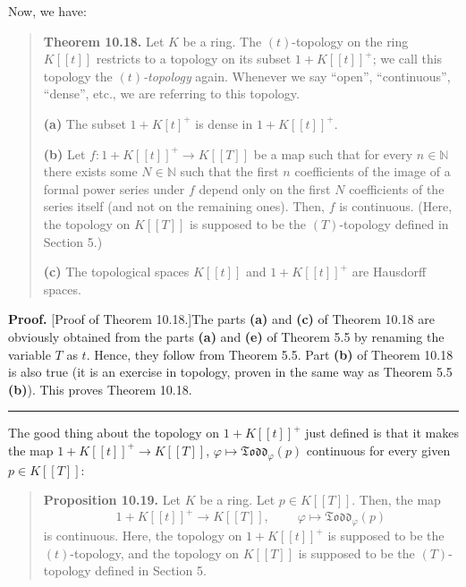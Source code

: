 \documentclass[numbers=enddot,12pt,final,onecolumn,notitlepage]{scrartcl}%
\newenvironment{proof}[1][Proof]{\noindent\textbf{#1.} }{\ \rule{0.5em}{0.5em}}
\begin{document}
Now, we have:

\begin{quote}
\textbf{Theorem 10.18.} Let $K$ be a ring. The $\left(  t\right)  $-topology
on the ring $K\left[  \left[  t\right]  \right]  $ restricts to a topology on
its subset $1+K\left[  \left[  t\right]  \right]  ^{+}$; we call this topology
the $\left(  t\right)  $\textit{-topology} again. Whenever we say ``open'',
``continuous'', ``dense'', etc., we are referring to this topology.

\textbf{(a)} The subset $1+K\left[  t\right]  ^{+}$ is dense in $1+K\left[
\left[  t\right]  \right]  ^{+}$.

\textbf{(b)} Let $f:1+K\left[  \left[  t\right]  \right]  ^{+}\rightarrow
K\left[  \left[  T\right]  \right]  $ be a map such that for every
$n\in\mathbb{N}$ there exists some $N\in\mathbb{N}$ such that the first $n$
coefficients of the image of a formal power series under $f$ depend only on
the first $N$ coefficients of the series itself (and not on the remaining
ones). Then, $f$ is continuous. (Here, the topology on $K\left[  \left[
T\right]  \right]  $ is supposed to be the $\left(  T\right)  $-topology
defined in Section 5.)

\textbf{(c)} The topological spaces $K\left[  \left[  t\right]  \right]  $ and
$1+K\left[  \left[  t\right]  \right]  ^{+}$ are Hausdorff spaces.
\end{quote}

\begin{proof}
[Proof of Theorem 10.18.]The parts \textbf{(a)} and \textbf{(c)} of Theorem
10.18 are obviously obtained from the parts \textbf{(a)} and \textbf{(e)} of
Theorem 5.5 by renaming the variable $T$ as $t$. Hence, they follow from
Theorem 5.5. Part \textbf{(b)} of Theorem 10.18 is also true (it is an
exercise in topology, proven in the same way as Theorem 5.5 \textbf{(b)}).
This proves Theorem 10.18.
\end{proof}

The good thing about the topology on $1+K\left[  \left[  t\right]  \right]
^{+}$ just defined is that it makes the map $1+K\left[  \left[  t\right]
\right]  ^{+}\rightarrow K\left[  \left[  T\right]  \right]  $, $\varphi
\mapsto\mathfrak{Todd}_{\varphi}\left(  p\right)  $ continuous for every given
$p\in K\left[  \left[  T\right]  \right]  $:

\begin{quote}
\textbf{Proposition 10.19.} Let $K$ be a ring. Let $p\in K\left[  \left[
T\right]  \right]  $. Then, the map%
\[
1+K\left[  \left[  t\right]  \right]  ^{+}\rightarrow K\left[  \left[
T\right]  \right]  ,\ \ \ \ \ \ \ \ \ \ \varphi\mapsto\mathfrak{Todd}%
_{\varphi}\left(  p\right)
\]
is continuous. Here, the topology on $1+K\left[  \left[  t\right]  \right]
^{+}$ is supposed to be the $\left(  t\right)  $-topology, and the topology on
$K\left[  \left[  T\right]  \right]  $ is supposed to be the $\left(
T\right)  $-topology defined in Section 5.
\end{quote}
\end{document}
